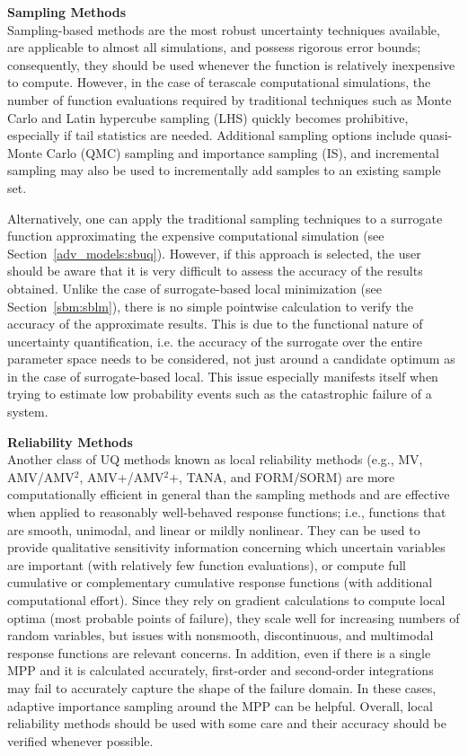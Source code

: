 {\bf Sampling Methods} \\
Sampling-based methods are the most robust uncertainty
techniques available, are applicable to almost all simulations, and
possess rigorous error bounds; consequently, they should be used
whenever the function is relatively inexpensive to compute. However,
in the case of terascale computational simulations, the number of
function evaluations required by traditional techniques such as Monte
Carlo and Latin hypercube sampling (LHS) quickly becomes prohibitive,
especially if tail statistics are needed. Additional sampling options
include quasi-Monte Carlo (QMC) sampling and importance sampling (IS), 
and incremental sampling may also be used to incrementally add samples 
to an existing sample set.

Alternatively, one can apply the traditional sampling techniques to a
surrogate function approximating the expensive computational
simulation (see Section~\ref{adv_models:sbuq}). However, if this
approach is selected, the user should be aware that it is very
difficult to assess the accuracy of the results obtained. Unlike
the case of surrogate-based local minimization (see
Section~\ref{sbm:sblm}), there is no simple pointwise calculation to
verify the accuracy of the approximate results. This is due to the
functional nature of uncertainty quantification, i.e. the accuracy of
the surrogate over the entire parameter space needs to be considered,
not just around a candidate optimum as in the case of surrogate-based
local. This issue especially manifests itself when trying to estimate
low probability events such as the catastrophic failure of a system.

{\bf Reliability Methods} \\
Another class of UQ methods known as local reliability methods (e.g.,
MV, AMV/AMV$^2$, AMV+/AMV$^2$+, TANA, and FORM/SORM) are more
computationally efficient in general than the sampling methods and are
effective when applied to reasonably well-behaved response functions;
i.e., functions that are smooth, unimodal, and linear or mildly
nonlinear. They can be used to provide qualitative sensitivity
information concerning which uncertain variables are important (with
relatively few function evaluations), or compute full cumulative or
complementary cumulative response functions (with additional
computational effort). Since they rely on gradient calculations to
compute local optima (most probable points of failure), they scale
well for increasing numbers of random variables, but issues with
nonsmooth, discontinuous, and multimodal response functions are
relevant concerns. In addition, even if there is a single MPP and it
is calculated accurately, first-order and second-order integrations
may fail to accurately capture the shape of the failure domain. In
these cases, adaptive importance sampling around the MPP can be
helpful. Overall, local reliability methods should be used with some
care and their accuracy should be verified whenever possible.


